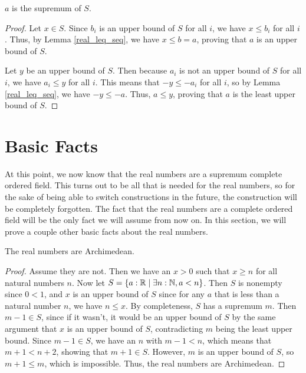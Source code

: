 \documentclass[../../math.tex]{subfiles}
\begin{document}
\begin{theorem}
    $a$ is the supremum of $S$.
\end{theorem}
\begin{proof}
    Let $x \in S$.  Since $b_i$ is an upper bound of $S$ for all $i$, we have $x
    \leq b_i$ for all $i$.  Thus, by Lemma \ref{real_leq_seq}, we have $x \leq b
    = a$, proving that $a$ is an upper bound of $S$.

    Let $y$ be an upper bound of $S$.  Then because $a_i$ is not an upper bound
    of $S$ for all $i$, we have $a_i \leq y$ for all $i$.  This means that $-y
    \leq -a_i$ for all $i$, so by Lemma \ref{real_leq_seq}, we have $-y \leq
    -a$.  Thus, $a \leq y$, proving that $a$ is the least upper bound of $S$.
\end{proof}

\section{Basic Facts}

At this point, we now know that the real numbers are a supremum complete ordered
field.  This turns out to be all that is needed for the real numbers, so for the
sake of being able to switch constructions in the future, the construction will
be completely forgotten. The fact that the real numbers are a complete ordered
field will be the only fact we will assume from now on.  In this section, we
will prove a couple other basic facts about the real numbers.

\begin{instance}
    The real numbers are Archimedean.
\end{instance}
\begin{proof}
    Assume they are not.  Then we have an $x > 0$ such that $x \geq n$ for all
    natural numbers $n$.  Now let $S = \{a : \mathbb{R} \mid \exists n : \mathbb{N}, a < n\}$.
    Then $S$ is nonempty since $0 < 1$, and $x$ is an upper bound of $S$ since
    for any $a$ that is less than a natural number $n$, we have $n \leq x$.  By
    completeness, $S$ has a supremum $m$.  Then $m - 1 \in S$, since if it
    wasn't, it would be an upper bound of $S$ by the same argument that $x$ is
    an upper bound of $S$, contradicting $m$ being the least upper bound.  Since
    $m - 1 \in S$, we have an $n$ with $m - 1 < n$, which means that $m + 1 < n
    + 2$, showing that $m + 1 \in S$.  However, $m$ is an upper bound of $S$, so
    $m + 1 \leq m$, which is impossible.  Thus, the real
    numbers are Archimedean.
\end{proof}
\end{document}
